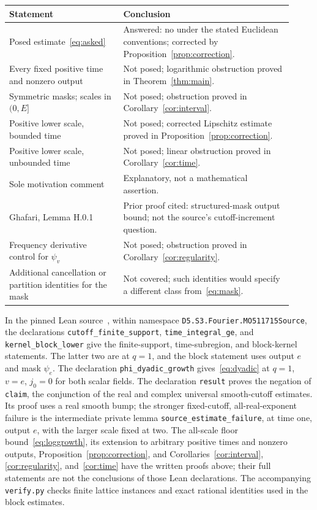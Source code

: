 \documentclass[11pt]{article}
\begin{document}
\begin{center}
\begin{tabular}{@{}>{\raggedright\arraybackslash}p{0.37\linewidth}>{\raggedright\arraybackslash}p{0.55\linewidth}@{}}
\toprule
Statement & Conclusion\\
\midrule
Posed estimate~\eqref{eq:asked} & Answered: no under the stated
Euclidean conventions; corrected by Proposition~\ref{prop:correction}.\\
Every fixed positive time and nonzero output & Not posed; logarithmic
obstruction proved in Theorem~\ref{thm:main}.\\
Symmetric masks; scales in $(0,E]$ & Not posed; obstruction proved in
Corollary~\ref{cor:interval}.\\
Positive lower scale, bounded time & Not posed; corrected Lipschitz
estimate proved in Proposition~\ref{prop:correction}.\\
Positive lower scale, unbounded time & Not posed; linear obstruction
proved in Corollary~\ref{cor:time}.\\
Sole motivation comment & Explanatory, not a mathematical assertion.\\
Ghafari, Lemma H.0.1 & Prior proof cited: structured-mask output bound;
not the source's cutoff-increment question.\\
Frequency derivative control for $\psi_v$ & Not posed; obstruction
proved in Corollary~\ref{cor:regularity}.\\
Additional cancellation or partition identities for the mask & Not covered;
such identities would specify a different class from~\eqref{eq:mask}.\\
\bottomrule
\end{tabular}
\end{center}

\begin{sloppypar}
In the pinned Lean source~\cite{lean}, within namespace
\texttt{D5.S3.Fourier.MO511715Source}, the declarations
\texttt{cutoff\_finite\_support}, \texttt{time\_integral\_ge},
and \texttt{kernel\_block\_lower} give the finite-support,
time-subregion, and block-kernel statements. The latter two are at
$q=1$, and the block statement uses output $e$ and mask $\psi_e$.
The declaration \texttt{phi\_dyadic\_growth} gives~\eqref{eq:dyadic}
at $q=1$, $v=e$, $j_0=0$ for both scalar fields.
The declaration \texttt{result} proves the negation of
\texttt{claim}, the conjunction of the real and complex universal
smooth-cutoff estimates. Its proof uses a real smooth bump;
the stronger fixed-cutoff, all-real-exponent failure is the intermediate
private lemma \texttt{source\_estimate\_failure}, at time one,
output $e$, with the larger scale fixed at two.
The all-scale floor bound~\eqref{eq:loggrowth}, its extension to arbitrary
positive times and nonzero outputs, Proposition~\ref{prop:correction},
and Corollaries~\ref{cor:interval}, \ref{cor:regularity}, and~\ref{cor:time}
have the written proofs above;
their full statements are not the conclusions of those Lean declarations.
The accompanying \texttt{verify.py} checks finite lattice instances and
exact rational identities used in the block estimates.
\end{sloppypar}
\end{document}
